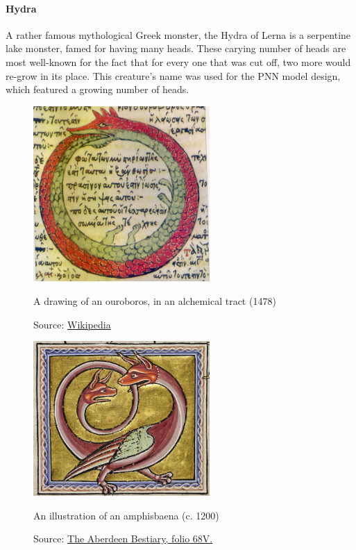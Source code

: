 \begin{uomappendix}
                \paragraph{Hydra} A rather famous mythological Greek monster, the Hydra of Lerna is a serpentine lake monster, famed for having many heads. These carying number of heads are most well-known for the fact that for every one that was cut off, two more would re-grow in its place. This creature's name was used for the PNN model design, which featured a growing number of heads.
    
                \begin{figure}[h]
                    \centering
                    \includegraphics[width=0.6\textwidth]{images/Ouroborus.jpg}
                    \caption{A drawing of an ouroboros, in an alchemical tract (1478)}
                    \label{fig:ouroboros}
                    \caption*{Source: \href{https://en.wikipedia.org/wiki/File:Serpiente_alquimica.jpg}{Wikipedia}}
                \end{figure}
    
                \begin{figure}[h]
                    \centering
                    \includegraphics[width=0.6\textwidth]{images/Amphisbaena.png}
                    \caption{An illustration of an amphisbaena (c. 1200)}
                    \label{fig:amphisbaena}
                    \caption*{Source: \href{https://www.abdn.ac.uk/bestiary/ms24/f68v}{The Aberdeen Bestiary, folio 68V.}}
                \end{figure}
    

\end{uomappendix}
